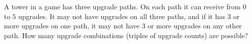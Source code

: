 A tower in a game has three upgrade paths. On each path it can receive from $0$ to $5$ upgrades. It may not have upgrades on all three paths, and if it has $3$ or more upgrades on one path, it may not have $3$ or more upgrades on any other path. How many upgrade combinations (triples of upgrade counts) are possible?
